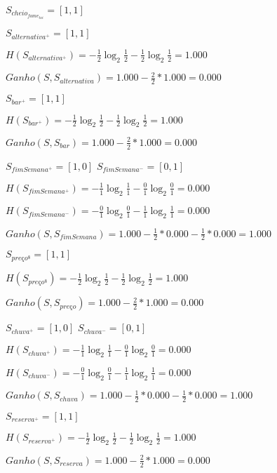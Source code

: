 
\par $S_{cheio_{fome_{tai}}} = [1,1]$

\vskip 0.31in
\par $S_{alternativa^{+}} = [1,1]$
\par $H(S_{alternativa^{+}}) = -\frac{1}{2} \log_2 \frac{1}{2}- \frac{1}{2} \log_2 \frac{1}{2} = 1.000$
\par $Ganho(S, S_{alternativa}) = 1.000-\frac{2}{2} * 1.000 = 0.000$

\vskip 0.3in
\par $S_{bar^{+}} = [1,1]$
\par $H(S_{bar^{+}}) = -\frac{1}{2} \log_2 \frac{1}{2}- \frac{1}{2} \log_2 \frac{1}{2} = 1.000$
\par $Ganho(S, S_{bar}) = 1.000-\frac{2}{2} * 1.000 = 0.000$

\vskip 0.3in
\par $S_{fimSemana^{+}} = [1,0]$ \qquad $S_{fimSemana^-} = [0,1]$
\par $H(S_{fimSemana^{+}}) = -\frac{1}{1} \log_2 \frac{1}{1}- \frac{0}{1} \log_2 \frac{0}{1} = 0.000$
\par $H(S_{fimSemana^-}) = -\frac{0}{1} \log_2 \frac{0}{1}- \frac{1}{1} \log_2 \frac{1}{1} = 0.000$
\par $Ganho(S, S_{fimSemana}) = 1.000-\frac{1}{2} * 0.000-\frac{1}{2} * 0.000 = 1.000$

\vskip 0.3in
\par $S_{preço^{\$}} = [1,1]$
\par $H(S_{preço^{\$}}) = -\frac{1}{2} \log_2 \frac{1}{2}- \frac{1}{2} \log_2 \frac{1}{2} = 1.000$
\par $Ganho(S, S_{preço}) = 1.000-\frac{2}{2} * 1.000 = 0.000$

\vskip 0.3in
\par $S_{chuva^+} = [1,0]$ \qquad $S_{chuva^-} = [0,1]$
\par $H(S_{chuva^+}) = -\frac{1}{1} \log_2 \frac{1}{1}- \frac{0}{1} \log_2 \frac{0}{1} = 0.000$
\par $H(S_{chuva^-}) = -\frac{0}{1} \log_2 \frac{0}{1}- \frac{1}{1} \log_2 \frac{1}{1} = 0.000$
\par $Ganho(S, S_{chuva}) = 1.000-\frac{1}{2} * 0.000-\frac{1}{2} * 0.000 = 1.000$

\vskip 0.3in
\par $S_{reserva^+} = [1,1]$
\par $H(S_{reserva^+}) = -\frac{1}{2} \log_2 \frac{1}{2}- \frac{1}{2} \log_2 \frac{1}{2} = 1.000$
\par $Ganho(S, S_{reserva}) = 1.000-\frac{2}{2} * 1.000 = 0.000$

